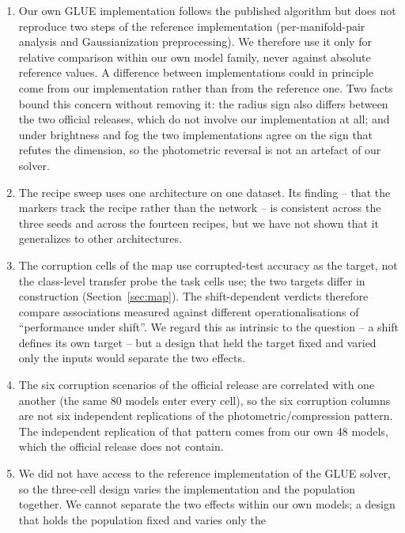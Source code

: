 \documentclass[10pt]{article}
\begin{document}
\begin{enumerate}
\item Our own GLUE implementation follows the published algorithm but does not
      reproduce two steps of the reference implementation (per-manifold-pair
      analysis and Gaussianization preprocessing). We therefore use it only
      for relative comparison within our own model family, never against
      absolute reference values. A difference between implementations could
      in principle come from our implementation rather than from the reference
      one. Two facts bound this concern without removing it: the radius
      sign also differs between the two official releases, which do not
      involve our implementation at all; and under brightness and fog the two
      implementations agree on the sign that refutes the dimension, so the
      photometric reversal is not an artefact of our solver.
\item The recipe sweep uses one architecture on one dataset. Its finding --
      that the markers track the recipe rather than the network -- is
      consistent across the three seeds and across the fourteen recipes, but
      we have not shown that it generalizes to other architectures.
\item The corruption cells of the map use corrupted-test accuracy as the
      target, not the class-level transfer probe the task cells use; the two
      targets differ in construction (Section~\ref{sec:map}). The
      shift-dependent verdicts therefore compare associations measured
      against different operationalisations of ``performance under shift''.
      We regard this as intrinsic to the question -- a shift defines its own
      target -- but a design that held the target fixed and varied only the
      inputs would separate the two effects.
\item The six corruption scenarios of the official release are correlated
      with one another (the same 80 models enter every cell), so the six
      corruption columns are not six independent replications of the
      photometric/compression pattern. The independent replication of that
      pattern comes from our own 48 models, which the official release does
      not contain.
\item We did not have access to the reference implementation of the GLUE
      solver, so the three-cell design varies the implementation and the
      population together. We cannot separate the two effects within our own
      models; a design that holds the population fixed and varies only the

\end{enumerate}
\end{document}
